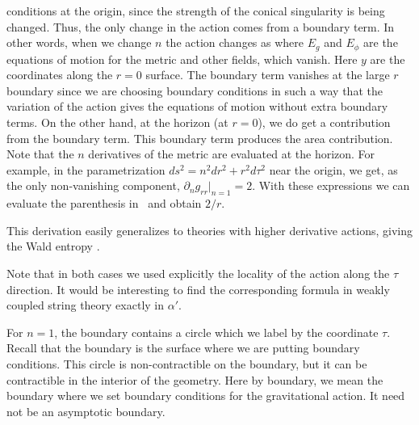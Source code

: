 conditions at the origin, since the strength of the conical singularity is being changed.
Thus, the only change in the action comes from a boundary term.
In other words, when we change $n$ the action
changes as
\eqn{}
where $E_g$ and $E_\phi$ are the equations of motion for the metric and other fields, which vanish. Here $y$ are
the coordinates along the $r=0$ surface.
 The boundary term vanishes at the large
$r$ boundary since we are choosing boundary conditions in such a way that the variation of the action
gives the equations of motion without extra boundary terms. On the other hand, at the horizon (at $r=0$),
we do get a contribution from the boundary term. This boundary term produces the area contribution. Note
that the $n$ derivatives of the metric are evaluated at the horizon. For example, in the
parametrization $ds^2 = n^2 dr^2 + r^2 d\tau^2$ near the origin, we get, as the only non-vanishing
component,  $\partial_n g_{rr}|_{n=1} = 2 $. With these expressions we can evaluate the parenthesis in \changec\
and obtain $2/r$.

This derivation easily generalizes to theories with higher derivative actions, giving
the Wald entropy \refs{\WaldNT,\IyerYS,\IyerKG}.

Note that in both cases we used explicitly the locality of the action along the $\tau$ direction. It would
be interesting to find the corresponding formula in weakly coupled string theory  exactly in $\alpha'$.





For $n=1$,
the boundary contains  a  circle which we  label by the coordinate $\tau$. Recall that the boundary is the surface
where we are putting boundary conditions. This circle is non-contractible on the boundary, but it can be contractible in
the interior of the geometry. Here by boundary, we mean the boundary where we set boundary conditions for the
gravitational action. It need not be an asymptotic boundary.

